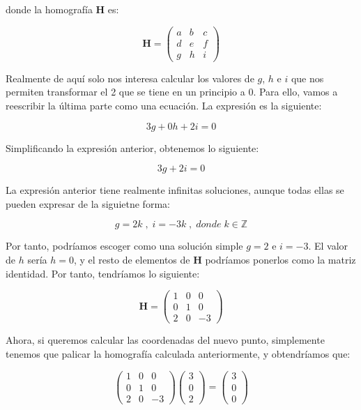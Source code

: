 \documentclass[11pt,a4paper]{article}
\begin{document}
\noindent donde la homografía $\mathbf{H}$ es:

\begin{equation}
\mathbf{H} = 	\begin{pmatrix}
 	a & b & c \\ 
 	d & e & f \\ 
 	g & h & i 
	\end{pmatrix}
\end{equation}

Realmente de aquí solo nos interesa calcular los valores de $g$, $h$ e $i$
que nos permiten transformar el 2 que se tiene en un principio a 0.
Para ello, vamos a reescribir la última parte como una ecuación.
La expresión es la siguiente:

\begin{equation}
	3g + 0h + 2i = 0
\end{equation}

Simplificando la expresión anterior, obtenemos lo siguiente:

\begin{equation}
	3g + 2i = 0
\end{equation}

La expresión anterior tiene realmente infinitas soluciones,
aunque todas ellas se pueden expresar de la siguietne forma:

\[
	g = 2k \; , \; i = -3k \;, \; donde \; k \in \mathbb{Z}
\]

Por tanto, podríamos escoger como una solución simple $g = 2$
e $i = -3$. El valor de $h$ sería $h = 0$, y el resto de elementos
de $\mathbf{H}$ podríamos ponerlos como la matriz identidad. Por
tanto, tendríamos lo siguiente:

\begin{equation}
\mathbf{H} = \begin{pmatrix}
 	1 & 0 & 0 \\ 
 	0 & 1 & 0 \\ 
 	2 & 0 & -3 
	\end{pmatrix}
\end{equation}

Ahora, si queremos calcular las coordenadas del nuevo punto, simplemente
tenemos que palicar la homografía calculada anteriormente, y obtendríamos
que:

\begin{equation}
	\begin{pmatrix}
 	1 & 0 & 0 \\ 
 	0 & 1 & 0 \\ 
 	2 & 0 & -3 
	\end{pmatrix}
	\begin{pmatrix}
 	3 \\ 
 	0 \\ 
 	2
	\end{pmatrix}
	=
	\begin{pmatrix}
 	3 \\ 
 	0 \\ 
 	0
	\end{pmatrix}
\end{equation}
\end{document}
